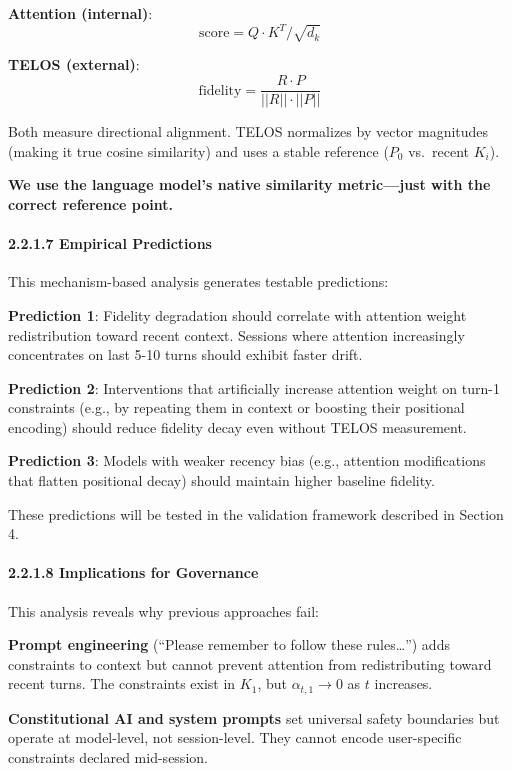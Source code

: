 \textbf{Attention (internal)}:
\[\text{score} = Q \cdot K^T / \sqrt{d_k}\]

\textbf{TELOS (external)}:
\[\text{fidelity} = \frac{R \cdot P}{||R|| \cdot ||P||}\]

Both measure directional alignment. TELOS normalizes by vector
magnitudes (making it true cosine similarity) and uses a stable
reference (\(P_0\) vs.~recent \(K_i\)).

\textbf{We use the language model's native similarity metric---just with
the correct reference point.}

\paragraph{2.2.1.7 Empirical Predictions}\label{empirical-predictions}

This mechanism-based analysis generates testable predictions:

\textbf{Prediction 1}: Fidelity degradation should correlate with
attention weight redistribution toward recent context. Sessions where
attention increasingly concentrates on last 5-10 turns should exhibit
faster drift.

\textbf{Prediction 2}: Interventions that artificially increase
attention weight on turn-1 constraints (e.g., by repeating them in
context or boosting their positional encoding) should reduce fidelity
decay even without TELOS measurement.

\textbf{Prediction 3}: Models with weaker recency bias (e.g., attention
modifications that flatten positional decay) should maintain higher
baseline fidelity.

These predictions will be tested in the validation framework described
in Section 4.

\paragraph{2.2.1.8 Implications for
Governance}\label{implications-for-governance}

This analysis reveals why previous approaches fail:

\textbf{Prompt engineering} (``Please remember to follow these
rules\ldots{}'') adds constraints to context but cannot prevent
attention from redistributing toward recent turns. The constraints exist
in \(K_1\), but \(\alpha_{t,1} \rightarrow 0\) as \(t\) increases.

\textbf{Constitutional AI and system prompts} set universal safety
boundaries but operate at model-level, not session-level. They cannot
encode user-specific constraints declared mid-session.

